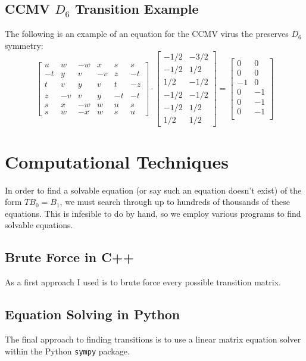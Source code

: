 \documentclass[a4paper,10pt]{article}
\theoremstyle{plain}
\theoremstyle{definition}
\theoremstyle{remark}
\begin{document}
\subsection{CCMV \(D_6\) Transition Example}
The following is an example of an equation for the CCMV virus the preserves \(D_6\) symmetry:
\[\begin{bmatrix}
    u  & w  & -w & x  & s  & s  \\
    -t & y  & v  & -v & z  & -t \\
    t  & v  & y  & v  & t  & -z \\
    z  & -v & v  & y  & -t & -t \\
    s  & x  & -w & w  & u  & s  \\
    s  & w  & -x & w  & s  & u 
\end{bmatrix}
\cdot
\begin{bmatrix}
-1/2 & -3/2 \\
-1/2 & 1/2 \\
1/2 & -1/2 \\
-1/2 & -1/2 \\
-1/2 & 1/2 \\
1/2 & 1/2
\end{bmatrix} 
=
\begin{bmatrix}
0 & 0 \\
0 & 0 \\
-1 & 0 \\
0 & -1 \\
0 & -1 \\
0 & -1 \\
\end{bmatrix}\]

\section{Computational Techniques}
In order to find a solvable equation (or say such an equation doesn't exist) of the form \(TB_0 = B_1\), we must search through up to hundreds of thousands of these equations.
This is infesible to do by hand, so we employ various programs to find solvable equations.

\subsection{Brute Force in C++}
As a first approach I used is to brute force every possible transition matrix.

\subsection{Equation Solving in Python}
The final approach to finding transitions is to use a linear matrix equation solver within the Python \texttt{sympy} package.
\end{document}
